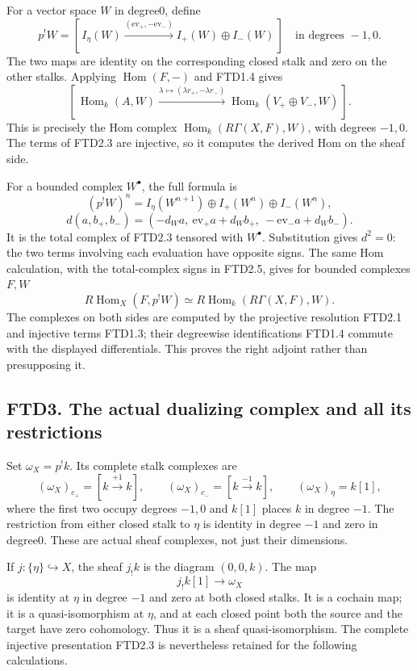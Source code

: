For a vector space \(W\) in degree0, define \[
\boxed{
p^!W=
[\,I_\eta(W)\xrightarrow{(\mathrm{ev}_+,-\mathrm{ev}_-)}
I_+(W)\oplus I_-(W)\,]
\quad\text{in degrees }-1,0.}
\tag{FTD2.3}
\] The two maps are identity on the corresponding closed stalk and zero
on the other stalks. Applying \(\operatorname{Hom}(F,-)\) and FTD1.4
gives \[
[\,\operatorname{Hom}_k(A,W)
\xrightarrow{\lambda\mapsto(\lambda r_+,-\lambda r_-)}
\operatorname{Hom}_k(V_+\oplus V_-,W)\,].
\tag{FTD2.4}
\] This is precisely the Hom complex
\(\operatorname{Hom}_k(R\Gamma(X,F),W)\), with degrees \(-1,0\). The
terms of FTD2.3 are injective, so it computes the derived Hom on the
sheaf side.

For a bounded complex \(W^\bullet\), the full formula is \[
(p^!W)^n=
I_\eta(W^{n+1})\oplus I_+(W^n)\oplus I_-(W^n),
\] \[
d(a,b_+,b_-)=
(-d_Wa,\ \mathrm{ev}_+a+d_Wb_+,\ -\mathrm{ev}_-a+d_Wb_-).
\tag{FTD2.5}
\] It is the total complex of FTD2.3 tensored with \(W^\bullet\).
Substitution gives \(d^2=0\): the two terms involving each evaluation
have opposite signs. The same Hom calculation, with the total-complex
signs in FTD2.5, gives for bounded complexes \(F,W\) \[
\boxed{
R\operatorname{Hom}_X(F,p^!W)
\simeq R\operatorname{Hom}_k(R\Gamma(X,F),W).}
\tag{FTD2.6}
\] The complexes on both sides are computed by the projective resolution
FTD2.1 and injective terms FTD1.3; their degreewise identifications
FTD1.4 commute with the displayed differentials. This proves the right
adjoint rather than presupposing it.

\subsection{FTD3. The actual dualizing complex and all its
restrictions}\label{ftd3.-the-actual-dualizing-complex-and-all-its-restrictions}

Set \(\omega_X=p^!k\). Its complete stalk complexes are \[
(\omega_X)_{c_+}=[k\xrightarrow{+1}k],\qquad
(\omega_X)_{c_-}=[k\xrightarrow{-1}k],\qquad
(\omega_X)_\eta=k[1],
\tag{FTD3.1}
\] where the first two occupy degrees \(-1,0\) and \(k[1]\) places \(k\)
in degree \(-1\). The restriction from either closed stalk to \(\eta\)
is identity in degree \(-1\) and zero in degree0. These are actual sheaf
complexes, not just their dimensions.

If \(j:\{\eta\}\hookrightarrow X\), the sheaf \(j_!k\) is the diagram
\((0,0,k)\). The map \[
j_!k[1]\longrightarrow\omega_X
\tag{FTD3.2}
\] is identity at \(\eta\) in degree \(-1\) and zero at both closed
stalks. It is a cochain map; it is a quasi-isomorphism at \(\eta\), and
at each closed point both the source and the target have zero
cohomology. Thus it is a sheaf quasi-isomorphism. The complete injective
presentation FTD2.3 is nevertheless retained for the following
calculations.

